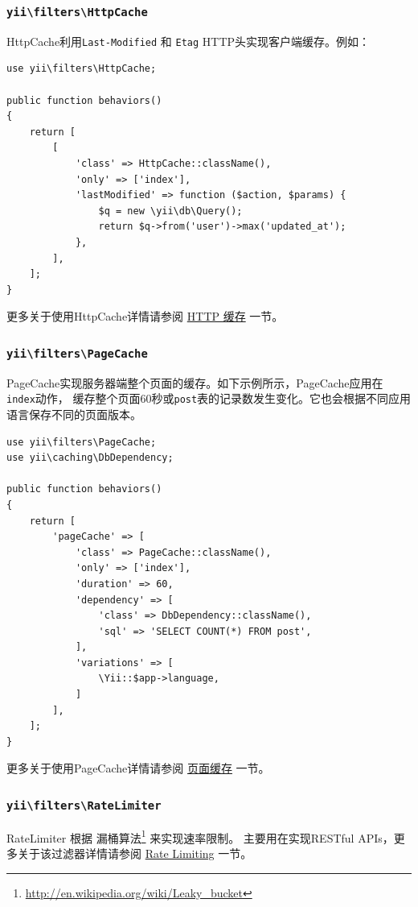 \subsubsection{\texttt{yii{\allowbreak{}\textbackslash}filters{\allowbreak{}\textbackslash}HttpCache} \label{structure-filters.md::http-cache}}
HttpCache利用\lstinline|Last-Modified| 和 \lstinline|Etag| HTTP头实现客户端缓存。例如：

\lstset{language=php}\begin{lstlisting}
use yii\filters\HttpCache;

public function behaviors()
{
    return [
        [
            'class' => HttpCache::className(),
            'only' => ['index'],
            'lastModified' => function ($action, $params) {
                $q = new \yii\db\Query();
                return $q->from('user')->max('updated_at');
            },
        ],
    ];
}
\end{lstlisting}
更多关于使用HttpCache详情请参阅 \hyperref[caching-http.md]{HTTP 缓存} 一节。

\subsubsection{\texttt{yii{\allowbreak{}\textbackslash}filters{\allowbreak{}\textbackslash}PageCache} \label{structure-filters.md::page-cache}}
PageCache实现服务器端整个页面的缓存。如下示例所示，PageCache应用在\lstinline|index|动作，
缓存整个页面60秒或\lstinline|post|表的记录数发生变化。它也会根据不同应用语言保存不同的页面版本。

\lstset{language=php}\begin{lstlisting}
use yii\filters\PageCache;
use yii\caching\DbDependency;

public function behaviors()
{
    return [
        'pageCache' => [
            'class' => PageCache::className(),
            'only' => ['index'],
            'duration' => 60,
            'dependency' => [
                'class' => DbDependency::className(),
                'sql' => 'SELECT COUNT(*) FROM post',
            ],
            'variations' => [
                \Yii::$app->language,
            ]
        ],
    ];
}
\end{lstlisting}
更多关于使用PageCache详情请参阅 \hyperref[caching-page.md]{页面缓存} 一节。

\subsubsection{\texttt{yii{\allowbreak{}\textbackslash}filters{\allowbreak{}\textbackslash}RateLimiter} \label{structure-filters.md::rate-limiter}}
RateLimiter 根据 漏桶算法\footnote{\url{http://en.wikipedia.org/wiki/Leaky\_bucket}} 来实现速率限制。
主要用在实现RESTful APIs，更多关于该过滤器详情请参阅 \hyperref[rest-rate-limiting.md]{Rate Limiting} 一节。

